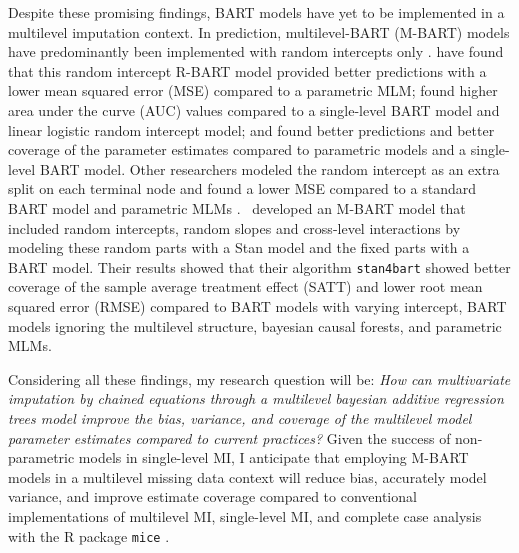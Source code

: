 \documentclass[3p,12pt,a4paper]{elsarticle}
\begin{document}
Despite these promising findings, BART models have yet to be implemented in a multilevel imputation context. In prediction, multilevel-BART (M-BART) models have predominantly been implemented with random intercepts only \citep{chen2020, wagner2020, tan2016, wundervald2022}. \citet{wagner2020} have found that this random intercept R-BART model provided better predictions with a lower mean squared error (MSE) compared to a parametric MLM; \citet{tan2016} found higher area under the curve (AUC) values compared to a single-level BART model and linear logistic random intercept model; and \citet{chen2020} found better predictions and better coverage of the parameter estimates compared to parametric models and a single-level BART model. Other researchers modeled the random intercept as an extra split on each terminal node and found a lower MSE compared to a standard BART model and parametric MLMs \citep{wundervald2022}.~\citet{dorie2022} developed an M-BART model that included random intercepts, random slopes and cross-level interactions by modeling these random parts with a Stan \citep{lee2017} model and the fixed parts with a BART model. Their results showed that their algorithm \texttt{stan4bart} showed better coverage of the sample average treatment effect (SATT) and lower root mean squared error (RMSE) compared to BART models with varying intercept, BART models ignoring the multilevel structure, bayesian causal forests, and parametric MLMs.



Considering all these findings, my research question will be: \textit{How can multivariate imputation by chained equations through a multilevel bayesian additive regression trees model improve the bias, variance, and coverage of the multilevel model parameter estimates compared to current practices?} Given the success of non-parametric models in single-level MI, I anticipate that employing M-BART models in a multilevel missing data context will reduce bias, accurately model variance, and improve estimate coverage compared to conventional implementations of multilevel MI, single-level MI, and complete case analysis with the R package \texttt{mice} \citep{buuren2011}. 
\end{document}
